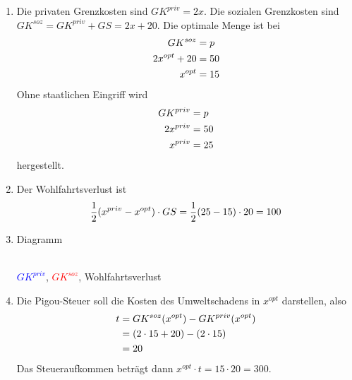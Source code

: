 \documentclass{article}
\begin{document}
	\begin{enumerate}[label=(\alph*)]
		\item Die privaten Grenzkosten sind $GK^{priv}=2x$. Die sozialen Grenzkosten sind $GK^{soz}=GK^{priv} + GS = 2x + 20$. Die optimale Menge ist bei
		\begin{align}
			GK^{soz} &= p \notag \\
			2x^{opt} + 20 &= 50 \notag \\
			x^{opt} &= 15 \notag
		\end{align}
		Ohne staatlichen Eingriff wird
		\begin{align}
			GK^{priv} &= p \notag \\
			2x^{priv} &= 50 \notag \\
			x^{priv} &= 25 \notag
		\end{align}
		hergestellt.
		\item Der Wohlfahrtsverlust ist
		\begin{align}
			\frac{1}{2}(x^{priv} - x^{opt}) \cdot GS = \frac{1}{2}(25-15)\cdot 20 = 100 \notag
		\end{align}
		\item Diagramm
		\begin{center}
			 \\
			\textcolor{blue}{$GK^{priv}$}, \textcolor{red}{$GK^{soz}$}, \textcolor{green!80!black}{Wohlfahrtsverlust}
		\end{center}
		\item Die Pigou-Steuer soll die Kosten des Umweltschadens in $x^{opt}$ darstellen, also
		\begin{align}
			t &= GK^{soz}(x^{opt}) - GK^{priv}(x^{opt}) \notag \\
			&= (2\cdot 15+20) - (2\cdot 15) \notag \\
			&= 20 \notag
		\end{align}
		Das Steueraufkommen beträgt dann $x^{opt}\cdot t = 15\cdot 20 = 300$.
	\end{enumerate}
	
\end{document}
